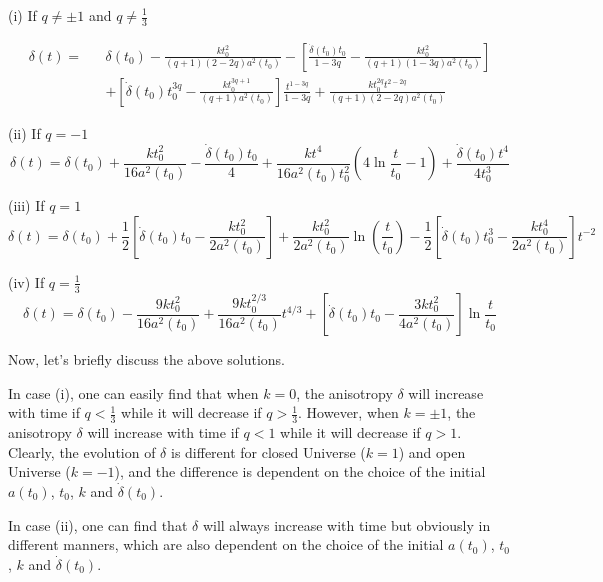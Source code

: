 \documentclass[a4paper,preprint]{revtex4}
\begin{document}
\noindent (i) If $q\neq\pm1$ and $q\neq\frac{1}{3}$

\begin{eqnarray}\label{deltageneral1}
\delta(t)=&&\delta(t_0)-\frac{k
t_0^{2}}{(q+1)(2-2q)a^2(t_0)}-\left[\frac{\dot{\delta}(t_0)t_0}{1-3q}-
\frac{k t_0^{2}}{(q+1)(1-3q)a^2(t_0)}\right]\\\nonumber
&&+\left[\dot{\delta}(t_0)t_0^{3q}-
\frac{kt_0^{3q+1}}{(q+1)a^2(t_0)}\right]\frac{t^{1-3q}}{1-3q}+\frac{kt_0^{2q}t^{2-2q}}{(q+1)(2-2q)a^2(t_0)}
\end{eqnarray}

\noindent (ii) If $q=-1$
\begin{equation}\label{deltageneral2}
\delta(t)=\delta(t_0)+\frac{kt_0^2}{16a^2(t_0)}-\frac{\dot{\delta}(t_0)t_0}{4}+
\frac{kt^4}{16a^2(t_0)t_0^2}(4\ln\frac{t}{t_0}-1)+\frac{\dot{\delta}(t_0)t^4}{4t_0^3}
\end{equation}

\noindent (iii) If $q=1$
\begin{equation}\label{deltageneral3}
\delta(t)=\delta(t_0)+\frac{1}{2}[\dot{\delta}(t_0)t_0-\frac{kt_0^2}{2a^2(t_0)}]
+\frac{kt_0^2}{2a^2(t_0)}\ln(\frac{t}{t_0})-\frac{1}{2}[\dot{\delta}(t_0)t_0^3-\frac{kt_0^4}{2a^2(t_0)}]t^{-2}
\end{equation}

\noindent (iv) If $q=\frac{1}{3}$
\begin{equation}\label{deltageneral4}
\delta(t)=\delta(t_0)-\frac{9kt_0^{2}}{16a^2(t_0)}+\frac{9kt_0^{2/3}}{16a^2(t_0)}t^{4/3}+[\dot{\delta}(t_0)t_0-\frac{3kt_0^{2}}{4a^2(t_0)}]\ln
\frac{t}{t_0}
\end{equation}

\noindent Now, let's briefly discuss the above solutions.

\noindent In case (i), one can easily find that when $k=0$, the
anisotropy $\delta$ will increase with time if $q<\frac{1}{3}$
while it will decrease if $q>\frac{1}{3}$. However, when $k=\pm1$,
the anisotropy $\delta$ will increase with time if $q<1$ while it
will decrease if $q>1$. Clearly, the evolution of $\delta$ is
different for closed Universe ($k=1$) and open Universe ($k=-1$),
and the difference is dependent on the choice of the initial
$a(t_0)$, $t_0$, $k$ and $\dot{\delta}(t_0)$.

\noindent In case (ii), one can find that $\delta$ will always
increase with time but obviously in different manners, which are
also dependent on the choice of the initial $a(t_0)$, $t_0$, $k$
and $\dot{\delta}(t_0)$.
\end{document}
